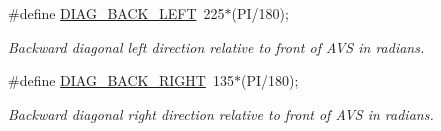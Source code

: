 \begin{DoxyCompactItemize}
\#define \mbox{\hyperlink{bot_main_8ino_ae4e94bd8dbc179e392c03bd987d6b05b}{D\+I\+A\+G\+\_\+\+B\+A\+C\+K\+\_\+\+L\+E\+FT}}~225$\ast$(PI/180);
\begin{DoxyCompactList}\small\item\em Backward diagonal left direction relative to front of A\+VS in radians. \end{DoxyCompactList}\item 
\#define \mbox{\hyperlink{bot_main_8ino_a2556f3b6bde97cfd17b3df68e3fca5fd}{D\+I\+A\+G\+\_\+\+B\+A\+C\+K\+\_\+\+R\+I\+G\+HT}}~135$\ast$(PI/180);
\begin{DoxyCompactList}\small\item\em Backward diagonal right direction relative to front of A\+VS in radians. \end{DoxyCompactList}\end{DoxyCompactItemize}
